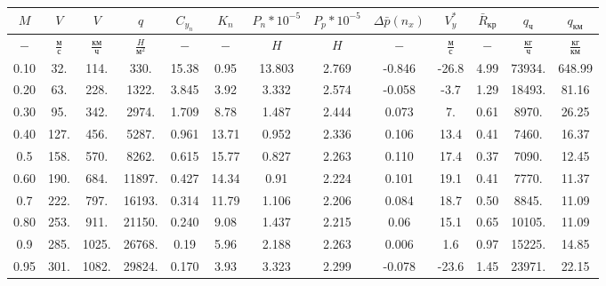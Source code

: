 \begin{tabular}{|c|c|c|c|c|c|c|c|c|c|c|c|c|}
\hline
$M$ & $V$ & $V$ & $q$ & $C_{y_n}$ & $K_n$ & $P_n*10^{-5}$ & $P_p*10^{-5}$ & $\Delta \bar{p}(n_x)$ & $V_y^*$ & $\bar{R}_{кр}$ & $q_{ч}$ & $q_{км}$ \\ 
\hline
$-$ & $\frac{м}{с}$ & $\frac{км}{ч}$ & $\frac{H}{м^2}$ & $-$ & $-$ & $H$ & $H$ & $-$ & $\frac{м}{с}$ & $-$ & $\frac{кг}{ч}$ & $\frac{кг}{км}$ \\ 
\hline
0.10 & 32. & 114. & 330. & 15.38 & 0.95 & 13.803 & 2.769 & -0.846 & -26.8 & 4.99 & 73934. & 648.99 \\ 
\hline
0.20 & 63. & 228. & 1322. & 3.845 & 3.92 & 3.332 & 2.574 & -0.058 & -3.7 & 1.29 & 18493. & 81.16 \\ 
\hline
0.30 & 95. & 342. & 2974. & 1.709 & 8.78 & 1.487 & 2.444 & 0.073 & 7. & 0.61 & 8970. & 26.25 \\ 
\hline
0.40 & 127. & 456. & 5287. & 0.961 & 13.71 & 0.952 & 2.336 & 0.106 & 13.4 & 0.41 & 7460. & 16.37 \\ 
\hline
0.5 & 158. & 570. & 8262. & 0.615 & 15.77 & 0.827 & 2.263 & 0.110 & 17.4 & 0.37 & 7090. & 12.45 \\ 
\hline
0.60 & 190. & 684. & 11897. & 0.427 & 14.34 & 0.91 & 2.224 & 0.101 & 19.1 & 0.41 & 7770. & 11.37 \\ 
\hline
0.7 & 222. & 797. & 16193. & 0.314 & 11.79 & 1.106 & 2.206 & 0.084 & 18.7 & 0.50 & 8845. & 11.09 \\ 
\hline
0.80 & 253. & 911. & 21150. & 0.240 & 9.08 & 1.437 & 2.215 & 0.06 & 15.1 & 0.65 & 10105. & 11.09 \\ 
\hline
0.9 & 285. & 1025. & 26768. & 0.19 & 5.96 & 2.188 & 2.263 & 0.006 & 1.6 & 0.97 & 15225. & 14.85 \\ 
\hline
0.95 & 301. & 1082. & 29824. & 0.170 & 3.93 & 3.323 & 2.299 & -0.078 & -23.6 & 1.45 & 23971. & 22.15 \\ 
\hline
\end{tabular}